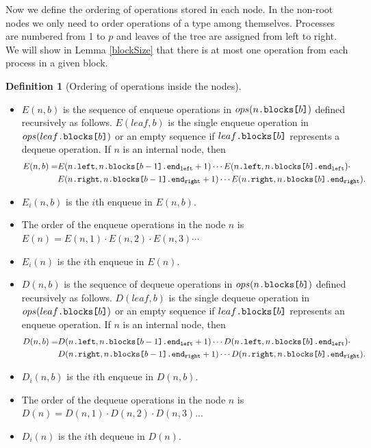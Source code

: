 \documentclass[10pt]{article}
\newcommand{\sub}[1]{\textsubscript{#1}}
\newcommand{\nf}[1]{{\normalfont{\texttt{#1}}}}
\theoremstyle{definition}
\newtheorem{definition}[theorem]{Definition}
\begin{document}
Now we define the ordering of operations stored in each node. In the non-root nodes we only need to order operations of a type among themselves. Processes are numbered from 1 to $p$ and leaves of the tree are assigned from left to right. We will show in Lemma \ref{blockSize} that there is at most one operation from each process in a given block.
\begin{definition} [Ordering of operations inside the nodes] \label{ordering}
\end{definition}
\begin{itemize}
  \item $E(n,b)$ is the sequence of enqueue operations in $ops(n\nf{.blocks[}b\nf{]})$ defined recursively as follows. $E(leaf,b)$ is the single enqueue operation in $ops(leaf\nf{.blocks[}b\nf{]})$ or an empty sequence if $leaf\nf{.blocks[}b\nf{]}$ represents a dequeue operation. If $n$ is an internal node, then
\begin{align*} 
E(n,b) =&  E(n\nf{.left},n\nf{.blocks[}b-1\nf{].end\sub{left}}+1)\cdots E(n\nf{.left},n\nf{.blocks[}b\nf{].end\sub{left}})\cdot \\ 
&E(n\nf{.right},n\nf{.blocks[}b-1\nf{].end\sub{right}}+1)\cdots E(n\nf{.right},n\nf{.blocks[}b\nf{].end\sub{right}}).
\end{align*}
  \item $E_i(n,b)$ is the $i$th enqueue in $E(n,b)$.
\item The order of the enqueue operations in the node $n$ is $E(n)=E(n,1)\cdot E(n,2)\cdot E(n,3)\cdots$
\item $E_i(n)$ is the $i$th enqueue in $E(n)$.
  \item $D(n,b)$ is the sequence of dequeue operations in $ops(n\nf{.blocks[}b\nf{]})$ defined recursively as follows. $D(leaf,b)$ is the single dequeue operation in $ops(leaf\nf{.blocks[}b\nf{]})$ or an empty sequence if $leaf\nf{.blocks[}b\nf{]}$ represents an enqueue operation. If $n$ is an internal node, then
\begin{align*} 
D(n,b) =&  D(n\nf{.left},n\nf{.blocks[}b-1\nf{].end\sub{left}}+1)\cdots D(n\nf{.left}, n\nf{.blocks[}b\nf{].end\sub{left}})\cdot \\ 
&D(n\nf{.right},n\nf{.blocks[}b-1\nf{].end\sub{right}}+1)\cdots D(n\nf{.right},n\nf{.blocks[}b\nf{].end\sub{right}}).
\end{align*}
    \item $D_i(n,b)$ is the $i$th enqueue in $D(n,b)$.
\item The order of the dequeue operations in the node $n$ is $D(n)=D(n,1)\cdot D(n,2)\cdot D(n,3)...$
\item $D_i(n)$ is the $i$th dequeue in $D(n)$.
\end{itemize}
\end{document}
